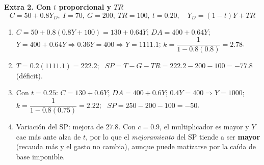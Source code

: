 \documentclass[11pt,addpoints]{article}
\begin{document}
\newpage
\vspace*{0.1cm}
\textbf{Extra 2. Con $t$ proporcional y $TR$}
\[
C=50+0.8Y_D,\ I=70,\ G=200,\ TR=100,\ t=0.20,\quad Y_D=(1-t)Y+TR
\]
\begin{enumerate}[label=\alph*)]

\item $C=50+0.8(0.8Y+100)=130+0.64Y$; $DA=400+0.64Y$; \\
$Y=400+0.64Y \Rightarrow 0.36Y=400 \Rightarrow \boxed{Y=1111.1}$; \quad $k=\dfrac{1}{1-0.8(0.8)}=\boxed{2.78}$.
\item $T=0.2(1111.1)=222.2$; \ $SP=T-G-TR=222.2-200-100=\boxed{-77.8}$ (déficit).
\item Con $t=0.25$: $C=130+0.6Y$; $DA=400+0.6Y$; $0.4Y=400 \Rightarrow \boxed{Y=1000}$; \\
$k=\dfrac{1}{1-0.8(0.75)}=\boxed{2.22}$; \ $SP=250-200-100=\boxed{-50}$.
\item Variación del SP: mejora de $27.8$. Con $c=0.9$, el multiplicador es mayor y $Y$ cae más ante alza de $t$, por lo que el \emph{mejoramiento} del SP tiende a ser \textbf{mayor} (recauda más y el gasto no cambia), aunque puede matizarse por la caída de base imponible.
\end{enumerate}
\end{document}
